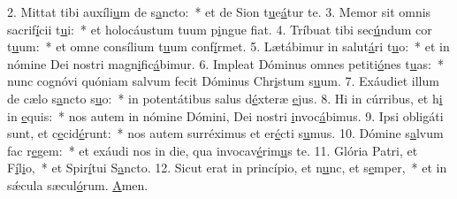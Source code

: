 2. Mittat tibi auxíli\uline{u}m de s\uline{a}ncto:~* et de Sion t\uline{u}e\uline{á}tur te.
3. Memor sit omnis sacrif\uline{í}cii t\uline{u}i:~* et holocáustum tuum p\uline{i}ngue f\uline{i}at.
4. Tríbuat tibi sec\uline{ú}ndum cor t\uline{u}um:~* et omne consílium t\uline{u}um conf\uline{í}rmet.
5. Lætábimur in salut\uline{á}ri t\uline{u}o:~* et in nómine Dei nostri magn\uline{i}fic\uline{á}bimur.
6. Impleat Dóminus omnes petiti\uline{ó}nes t\uline{u}as:~* nunc cognóvi quóniam salvum fecit Dóminus Chr\uline{i}stum s\uline{u}um.
7. Exáudiet illum de cælo s\uline{a}ncto s\uline{u}o:~* in potentátibus salus d\uline{é}xteræ \uline{e}jus.
8. Hi in cúrribus, et h\uline{i} in \uline{e}quis:~* nos autem in nómine Dómini, Dei nostri \uline{i}nvoc\uline{á}bimus.
9. Ipsi obligáti sunt, et c\uline{e}cid\uline{é}runt:~* nos autem surréximus et er\uline{é}cti s\uline{u}mus.
10. Dómine s\uline{a}lvum fac r\uline{e}gem:~* et exáudi nos in die, qua invocav\uline{é}rim\uline{u}s te.
11. Glória Patri, et F\uline{í}l\uline{i}o,~* et Spir\uline{í}tui S\uline{a}ncto.
12. Sicut erat in princípio, et n\uline{u}nc, et s\uline{e}mper,~* et in sǽcula sæcul\uline{ó}rum. \uline{A}men.
